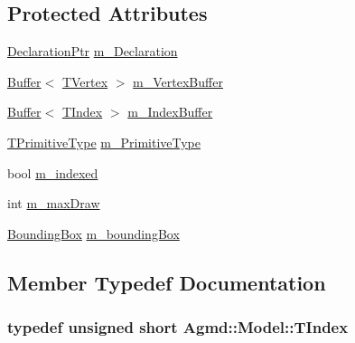 \subsection*{Protected Attributes}
\begin{DoxyCompactItemize}
\item 
\hyperlink{namespace_agmd_a7784897efe9624596f7980eef99ace59}{Declaration\+Ptr} \hyperlink{class_agmd_1_1_model_a47e9dd76c4e80c64bf5a2b47a0640cde}{m\+\_\+\+Declaration}
\item 
\hyperlink{class_agmd_1_1_buffer}{Buffer}$<$ \hyperlink{struct_agmd_1_1_model_1_1_t_vertex}{T\+Vertex} $>$ \hyperlink{class_agmd_1_1_model_a3ca80a337e1c867da9ba233ab63edac4}{m\+\_\+\+Vertex\+Buffer}
\item 
\hyperlink{class_agmd_1_1_buffer}{Buffer}$<$ \hyperlink{class_agmd_1_1_model_aca4a6ee5402b386a0b9d0aea52c71eaa}{T\+Index} $>$ \hyperlink{class_agmd_1_1_model_a540f1a14d20859987f195e7b3b4b75c6}{m\+\_\+\+Index\+Buffer}
\item 
\hyperlink{namespace_agmd_a0e38d0c34891ddd6eef72e1c9e55161c}{T\+Primitive\+Type} \hyperlink{class_agmd_1_1_model_ab1c4d49d1ceb1b6805818c0f551cefe5}{m\+\_\+\+Primitive\+Type}
\item 
bool \hyperlink{class_agmd_1_1_model_a2b1cad2a5d99cc731cdd0fb1e93494c7}{m\+\_\+indexed}
\item 
int \hyperlink{class_agmd_1_1_model_aa701193843b8e5a474af2ed70ed799c2}{m\+\_\+max\+Draw}
\item 
\hyperlink{class_agmd_1_1_bounding_box}{Bounding\+Box} \hyperlink{class_agmd_1_1_model_a6540164d647c732bc31a56b1b0428372}{m\+\_\+bounding\+Box}
\end{DoxyCompactItemize}


\subsection{Member Typedef Documentation}
\hypertarget{class_agmd_1_1_model_aca4a6ee5402b386a0b9d0aea52c71eaa}{
\subsubsection[{T\+Index}]{\setlength{\rightskip}{0pt plus 5cm}typedef unsigned short {\bf Agmd\+::\+Model\+::\+T\+Index}}}\label{class_agmd_1_1_model_aca4a6ee5402b386a0b9d0aea52c71eaa}


